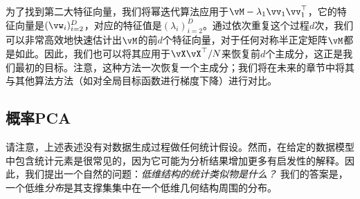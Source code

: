 \documentclass[../../book-main.tex]{subfiles}
\begin{document}

为了找到第二大特征向量，我们将幂迭代算法应用于\(\vM - \lambda_{1}\vv_{1}\vv_{1}^{\top}\)，它的特征向量是\((\vw_{i})_{i = 2}^{D}\)，对应的特征值是\((\lambda_{i})_{i = 2}^{D}\)。通过依次重复这个过程\(d\)次，我们可以非常高效地快速估计出\(\vM\)的前\(d\)个特征向量，对于任何对称半正定矩阵\(\vM\)都是如此。因此，我们也可以将其应用于\(\vX\vX^{\top}/N\)来恢复前\(d\)个主成分，这正是我们最初的目标。注意，这种方法一次恢复一个主成分；我们将在未来的章节中将其与其他算法方法（如对全局目标函数进行梯度下降）进行对比。





\subsection{概率PCA}\label{subsec:probabilistic PCA}

请注意，上述表述没有对数据生成过程做任何统计假设。然而，在给定的数据模型中包含统计元素是很常见的，因为它可能为分析结果增加更多有启发性的解释。因此，我们提出一个自然的问题：\textit{低维结构的统计类似物是什么？} 我们的答案是，一个低维\textit{分布}是其支撑集集中在一个低维几何结构周围的分布。
\end{document}

